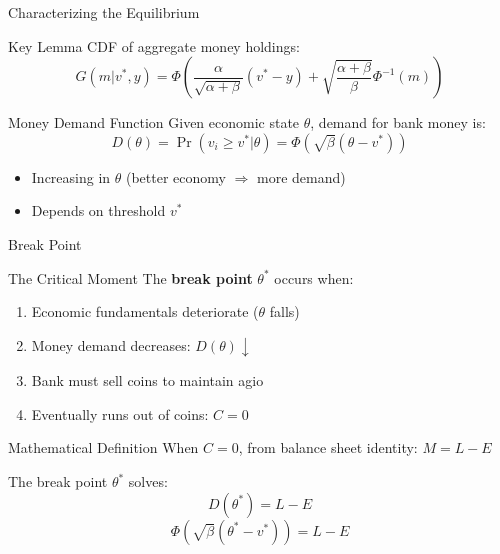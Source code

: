 \documentclass[aspectratio=169, xcolor=table]{beamer}
\begin{document}
\begin{frame}{Characterizing the Equilibrium}
  \begin{block}{Key Lemma}
    CDF of aggregate money holdings:
    \[
      G(m|v^*, y) = \Phi \left( \frac{\alpha}{\sqrt{\alpha + \beta}} (v^* - y) + \sqrt{\frac{\alpha + \beta}{\beta}} \Phi^{-1}(m) \right)
    \]
  \end{block}
  \begin{block}{Money Demand Function}
    Given economic state $\theta$, demand for bank money is:
    \[
      D(\theta) = \Pr(v_i \geq v^*|\theta) = \Phi\left(\sqrt{\beta}(\theta - v^*)\right)
    \]
    \begin{itemize}
      \item Increasing in $\theta$ (better economy $\Rightarrow$ more demand)
      \item Depends on threshold $v^*$
    \end{itemize}
  \end{block}
\end{frame}

\begin{frame}{Break Point}
  \begin{block}{The Critical Moment}
    The \textbf{break point} $\theta^*$ occurs when:
    \begin{enumerate}
      \item Economic fundamentals deteriorate ($\theta$ falls)
      \item Money demand decreases: $D(\theta) \downarrow$
      \item Bank must sell coins to maintain agio
      \item Eventually runs out of coins: $C = 0$
    \end{enumerate}
  \end{block}

  \begin{block}{Mathematical Definition}
    When $C = 0$, from balance sheet identity:
    $M = L - E$

    The break point $\theta^*$ solves:
    \[
      D(\theta^*) = L - E
    \]
    \[
      \Phi\left(\sqrt{\beta}(\theta^* - v^*)\right) = L - E
    \]
  \end{block}
\end{frame}
\end{document}
